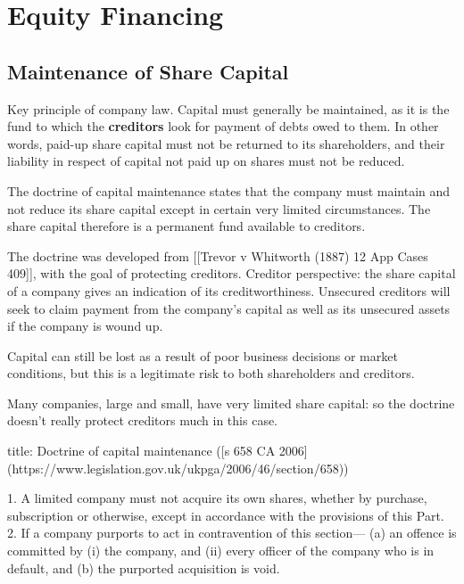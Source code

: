 \documentclass[
]{article}
\newenvironment{Shaded}{}{}
\newcommand{\NormalTok}[1]{#1}
\begin{document}
\hypertarget{equity-financing}{%
\section{Equity Financing}\label{equity-financing}}

\hypertarget{maintenance-of-share-capital}{%
\subsection{Maintenance of Share
Capital}\label{maintenance-of-share-capital}}

Key principle of company law. Capital must generally be maintained, as
it is the fund to which the \textbf{creditors} look for payment of debts
owed to them. In other words, paid-up share capital must not be returned
to its shareholders, and their liability in respect of capital not paid
up on shares must not be reduced.

The doctrine of capital maintenance states that the company must
maintain and not reduce its share capital except in certain very limited
circumstances. The share capital therefore is a permanent fund available
to creditors.

The doctrine was developed from {[}{[}Trevor v Whitworth (1887) 12 App
Cases 409{]}{]}, with the goal of protecting creditors. Creditor
perspective: the share capital of a company gives an indication of its
creditworthiness. Unsecured creditors will seek to claim payment from
the company's capital as well as its unsecured assets if the company is
wound up.

Capital can still be lost as a result of poor business decisions or
market conditions, but this is a legitimate risk to both shareholders
and creditors.

Many companies, large and small, have very limited share capital: so the
doctrine doesn't really protect creditors much in this case.

\begin{Shaded}
\begin{Highlighting}[]
\NormalTok{title: Doctrine of capital maintenance ([s 658 CA 2006](https://www.legislation.gov.uk/ukpga/2006/46/section/658))}

\NormalTok{ 1. A limited company must not acquire its own shares, whether by purchase, subscription or otherwise, except in accordance with the provisions of this Part.}
\NormalTok{ 2. If a company purports to act in contravention of this section—}
\NormalTok{(a) an offence is committed by (i) the company, and (ii) every officer of the company who is in default, and}
\NormalTok{(b) the purported acquisition is void.}
\end{Highlighting}
\end{Shaded}
\end{document}
